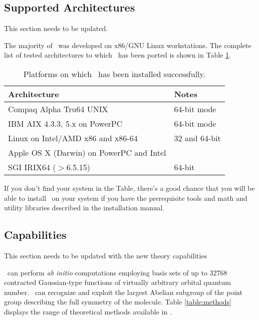 \subsection{{\color{red} Supported Architectures}}
{\color{red} This section needs to be updated.}

The majority of \PSIfour\ was developed on x86/GNU Linux workstations.
The complete list of
tested architectures to which \PSIfour\ has
been ported is shown in Table \ref{table:ports}.
\begin{table}[h]
\caption{Platforms on which \PSIfour\ has been installed successfully.}
\label{table:ports}
\begin{center}
\begin{tabular}{ll} \hline\hline
Architecture              &  Notes \\ \hline
Compaq Alpha Tru64 UNIX   & 64-bit mode \\
IBM AIX 4.3.3, 5.x on PowerPC & 64-bit mode \\
Linux on Intel/AMD x86 and x86-64  & 32 and 64-bit\\
Apple OS X (Darwin) on PowerPC and Intel & \\
SGI IRIX64 ($>$6.5.15)    & 64-bit \\ \hline\hline
\end{tabular}
\end{center}
\end{table}
If you don't find your system in the Table, there's a good chance
that you will be able to install \PSIfour\ on your system
if you have the prerequisite tools and math and utility libraries described 
in the installation manual.

\subsection{{\color{red} Capabilities}}
{\color{red} This section needs to be updated with the new theory capabilities}

\PSIfour\ can perform {\em ab initio} computations employing
basis sets of up to 32768 contracted Gaussian-type functions of
virtually arbitrary orbital quantum number.
\PSIfour\ can recognize and exploit the largest Abelian subgroup of the
point group describing the full symmetry of the molecule.
Table \ref{table:methods} displays the range of theoretical
methods available in \PSIfour .

